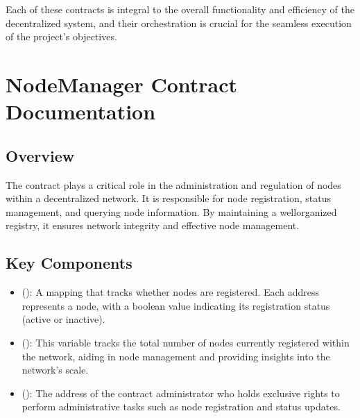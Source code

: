 \documentclass[letterpaper,10pt,english]{sphinxmanual}
\let\sphinxpxdimen\pdfpxdimen\else\newdimen\sphinxpxdimen
\begin{document}
\noindent{\hspace*{\fill}\sphinxincludegraphics[width=600\sphinxpxdimen]{{_static/architecture-image}.png}\hspace*{\fill}}

\sphinxAtStartPar
Each of these contracts is integral to the overall functionality and efficiency of the decentralized system, and their orchestration is crucial for the seamless execution of the project’s objectives.
{\color{red}\bfseries{}\textasciigrave{}\textasciigrave{}}{\color{red}\bfseries{}\textasciigrave{}}

\sphinxstepscope


\chapter{NodeManager Contract Documentation}
\label{\detokenize{docs_node_manager_contract:nodemanager-contract-documentation}}\label{\detokenize{docs_node_manager_contract::doc}}

\section{Overview}
\label{\detokenize{docs_node_manager_contract:overview}}
\sphinxAtStartPar
The  contract plays a critical role in the administration and regulation of nodes within a decentralized network. It is responsible for node registration, status management, and querying node information. By maintaining a well\sphinxhyphen{}organized registry, it ensures network integrity and effective node management.


\section{Key Components}
\label{\detokenize{docs_node_manager_contract:key-components}}
\sphinxAtStartPar
{}
\begin{itemize}
\item {} 
\sphinxAtStartPar
{} ():
A mapping that tracks whether nodes are registered. Each address represents a node, with a boolean value indicating its registration status (active or inactive).

\item {} 
\sphinxAtStartPar
{} ():
This variable tracks the total number of nodes currently registered within the network, aiding in node management and providing insights into the network’s scale.

\item {} 
\sphinxAtStartPar
{} ():
The address of the contract administrator who holds exclusive rights to perform administrative tasks such as node registration and status updates.

\end{itemize}
\end{document}

